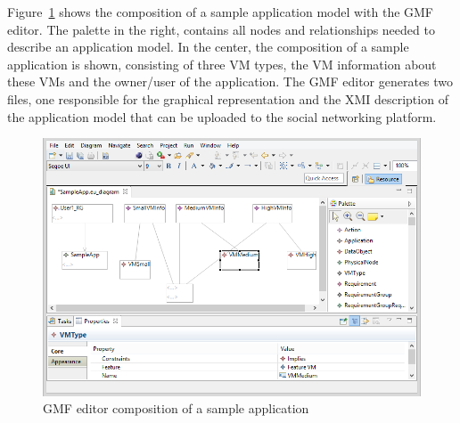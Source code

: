 Figure~\ref{fig:sensapp_as_gmf} shows the composition of a sample application model with the GMF editor. The palette in the right, contains all nodes and relationships needed to describe an application model. In the center, the composition of a sample application is shown, consisting of three VM types, the VM information about these VMs and the owner/user of the application. The GMF editor generates two files, one responsible for the graphical representation and the XMI description of the application model that can be uploaded to the social networking platform.

\begin{figure}
  \centering
  \includegraphics[scale=0.6]{./fig/gmf_editor.png}
  \caption{GMF editor composition of a sample application}
  \label{fig:sensapp_as_gmf}
\end{figure}
